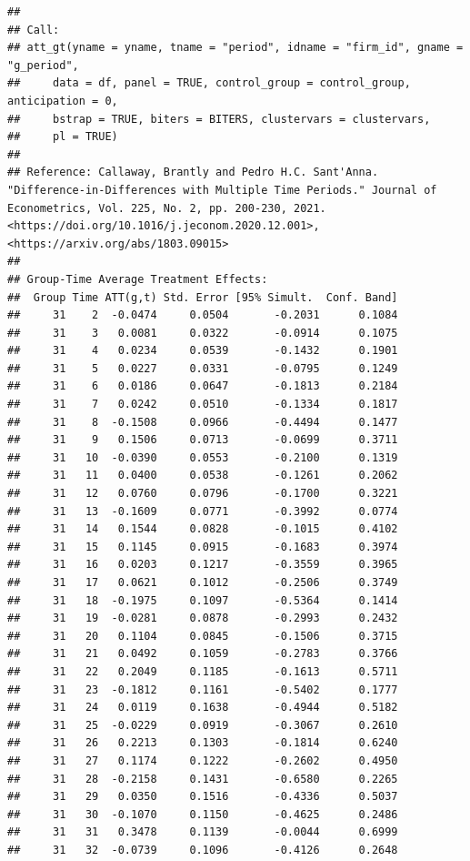 \documentclass[
]{article}
\begin{document}
\begin{verbatim}
## 
## Call:
## att_gt(yname = yname, tname = "period", idname = "firm_id", gname = "g_period", 
##     data = df, panel = TRUE, control_group = control_group, anticipation = 0, 
##     bstrap = TRUE, biters = BITERS, clustervars = clustervars, 
##     pl = TRUE)
## 
## Reference: Callaway, Brantly and Pedro H.C. Sant'Anna.  "Difference-in-Differences with Multiple Time Periods." Journal of Econometrics, Vol. 225, No. 2, pp. 200-230, 2021. <https://doi.org/10.1016/j.jeconom.2020.12.001>, <https://arxiv.org/abs/1803.09015> 
## 
## Group-Time Average Treatment Effects:
##  Group Time ATT(g,t) Std. Error [95% Simult.  Conf. Band]  
##     31    2  -0.0474     0.0504       -0.2031      0.1084  
##     31    3   0.0081     0.0322       -0.0914      0.1075  
##     31    4   0.0234     0.0539       -0.1432      0.1901  
##     31    5   0.0227     0.0331       -0.0795      0.1249  
##     31    6   0.0186     0.0647       -0.1813      0.2184  
##     31    7   0.0242     0.0510       -0.1334      0.1817  
##     31    8  -0.1508     0.0966       -0.4494      0.1477  
##     31    9   0.1506     0.0713       -0.0699      0.3711  
##     31   10  -0.0390     0.0553       -0.2100      0.1319  
##     31   11   0.0400     0.0538       -0.1261      0.2062  
##     31   12   0.0760     0.0796       -0.1700      0.3221  
##     31   13  -0.1609     0.0771       -0.3992      0.0774  
##     31   14   0.1544     0.0828       -0.1015      0.4102  
##     31   15   0.1145     0.0915       -0.1683      0.3974  
##     31   16   0.0203     0.1217       -0.3559      0.3965  
##     31   17   0.0621     0.1012       -0.2506      0.3749  
##     31   18  -0.1975     0.1097       -0.5364      0.1414  
##     31   19  -0.0281     0.0878       -0.2993      0.2432  
##     31   20   0.1104     0.0845       -0.1506      0.3715  
##     31   21   0.0492     0.1059       -0.2783      0.3766  
##     31   22   0.2049     0.1185       -0.1613      0.5711  
##     31   23  -0.1812     0.1161       -0.5402      0.1777  
##     31   24   0.0119     0.1638       -0.4944      0.5182  
##     31   25  -0.0229     0.0919       -0.3067      0.2610  
##     31   26   0.2213     0.1303       -0.1814      0.6240  
##     31   27   0.1174     0.1222       -0.2602      0.4950  
##     31   28  -0.2158     0.1431       -0.6580      0.2265  
##     31   29   0.0350     0.1516       -0.4336      0.5037  
##     31   30  -0.1070     0.1150       -0.4625      0.2486  
##     31   31   0.3478     0.1139       -0.0044      0.6999  
##     31   32  -0.0739     0.1096       -0.4126      0.2648  

\end{verbatim}
\end{document}
